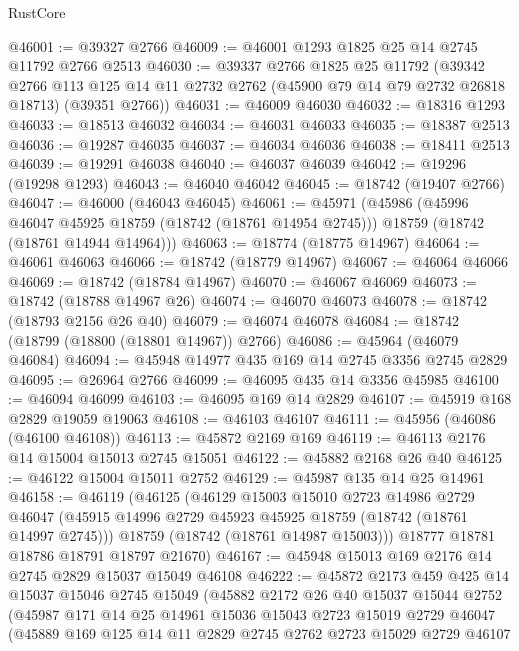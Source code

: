 \begin{lexlean}{RustCore}
\begin{coremodule}
@46001 := @39327 @2766
@46009 := @46001 @1293 @1825 @25 @14 @2745 @11792 @2766 @2513
@46030 := @39337
    @2766
    @1825
    @25
    @11792
    (@39342
      @2766
      @113
      @125
      @14
      @11
      @2732
      @2762
      (@45900 @79 @14 @79 @2732 @26818 @18713)
      (@39351 @2766))
@46031 := @46009 @46030
@46032 := @18316 @1293
@46033 := @18513 @46032
@46034 := @46031 @46033
@46035 := @18387 @2513
@46036 := @19287 @46035
@46037 := @46034 @46036
@46038 := @18411 @2513
@46039 := @19291 @46038
@46040 := @46037 @46039
@46042 := @19296 (@19298 @1293)
@46043 := @46040 @46042
@46045 := @18742 (@19407 @2766)
@46047 := @46000 (@46043 @46045)
@46061 := @45971
    (@45986
      (@45996 @46047 @45925 @18759 (@18742 (@18761 @14954 @2745)))
      @18759
      (@18742 (@18761 @14944 @14964)))
@46063 := @18774 (@18775 @14967)
@46064 := @46061 @46063
@46066 := @18742 (@18779 @14967)
@46067 := @46064 @46066
@46069 := @18742 (@18784 @14967)
@46070 := @46067 @46069
@46073 := @18742 (@18788 @14967 @26)
@46074 := @46070 @46073
@46078 := @18742 (@18793 @2156 @26 @40)
@46079 := @46074 @46078
@46084 := @18742 (@18799 (@18800 (@18801 @14967)) @2766)
@46086 := @45964 (@46079 @46084)
@46094 := @45948 @14977 @435 @169 @14 @2745 @3356 @2745 @2829
@46095 := @26964 @2766
@46099 := @46095 @435 @14 @3356 @45985
@46100 := @46094 @46099
@46103 := @46095 @169 @14 @2829
@46107 := @45919 @168 @2829 @19059 @19063
@46108 := @46103 @46107
@46111 := @45956 (@46086 (@46100 @46108))
@46113 := @45872 @2169 @169
@46119 := @46113 @2176 @14 @15004 @15013 @2745 @15051
@46122 := @45882 @2168 @26 @40
@46125 := @46122 @15004 @15011 @2752
@46129 := @45987 @135 @14 @25 @14961
@46158 := @46119
    (@46125
      (@46129
        @15003
        @15010
        @2723
        @14986
        @2729
        @46047
        (@45915 @14996 @2729 @45923 @45925 @18759 (@18742 (@18761 @14997 @2745)))
        @18759
        (@18742 (@18761 @14987 @15003)))
      @18777
      @18781
      @18786
      @18791
      @18797
      @21670)
@46167 := @45948 @15013 @169 @2176 @14 @2745 @2829 @15037 @15049 @46108
@46222 := @45872
    @2173
    @459
    @425
    @14
    @15037
    @15046
    @2745
    @15049
    (@45882
      @2172
      @26
      @40
      @15037
      @15044
      @2752
      (@45987
        @171
        @14
        @25
        @14961
        @15036
        @15043
        @2723
        @15019
        @2729
        @46047
        (@45889
          @169
          @125
          @14
          @11
          @2829
          @2745
          @2762
          @2723
          @15029
          @2729
          @46107

\end{coremodule}
\end{lexlean}
